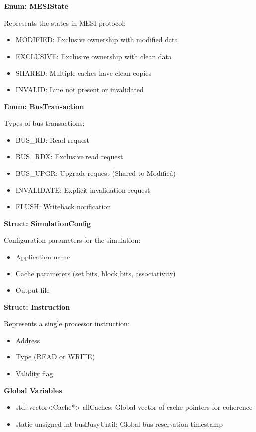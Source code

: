 \documentclass[12pt,a4paper]{article}
\begin{document}
\textbf{Enum: MESIState}

Represents the states in MESI protocol:
\begin{itemize}
    \item MODIFIED: Exclusive ownership with modified data
    \item EXCLUSIVE: Exclusive ownership with clean data
    \item SHARED: Multiple caches have clean copies
    \item INVALID: Line not present or invalidated
\end{itemize}

\textbf{Enum: BusTransaction}

Types of bus transactions:
\begin{itemize}
    \item BUS\_RD: Read request
    \item BUS\_RDX: Exclusive read request
    \item BUS\_UPGR: Upgrade request (Shared to Modified)
    \item INVALIDATE: Explicit invalidation request
    \item FLUSH: Writeback notification
\end{itemize}

\textbf{Struct: SimulationConfig}

Configuration parameters for the simulation:
\begin{itemize}
    \item Application name
    \item Cache parameters (set bits, block bits, associativity)
    \item Output file
\end{itemize}

\textbf{Struct: Instruction}

Represents a single processor instruction:
\begin{itemize}
    \item Address
    \item Type (READ or WRITE)
    \item Validity flag
\end{itemize}

\textbf{Global Variables}
\begin{itemize}
    \item std::vector<Cache*> allCaches: Global vector of cache pointers for coherence
    \item static unsigned int busBusyUntil: Global bus-reservation timestamp
\end{itemize}
\end{document}
